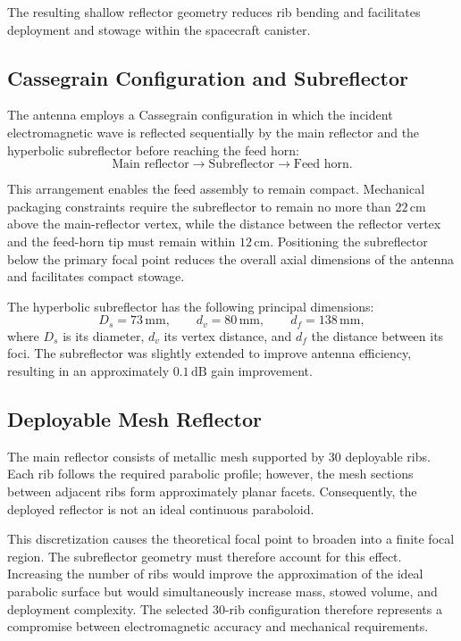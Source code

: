 The resulting shallow reflector geometry reduces rib bending and facilitates deployment and stowage within the spacecraft canister.

\subsection{Cassegrain Configuration and Subreflector}

The antenna employs a Cassegrain configuration in which the incident electromagnetic wave is reflected sequentially by the main reflector and the hyperbolic subreflector before reaching the feed horn:
\[
\text{Main reflector}
\rightarrow
\text{Subreflector}
\rightarrow
\text{Feed horn}.
\]

This arrangement enables the feed assembly to remain compact. Mechanical packaging constraints require the subreflector to remain no more than $22\,\mathrm{cm}$ above the main-reflector vertex, while the distance between the reflector vertex and the feed-horn tip must remain within $12\,\mathrm{cm}$. Positioning the subreflector below the primary focal point reduces the overall axial dimensions of the antenna and facilitates compact stowage.

The hyperbolic subreflector has the following principal dimensions:
\[
D_s=73\,\mathrm{mm},
\qquad
d_v=80\,\mathrm{mm},
\qquad
d_f=138\,\mathrm{mm},
\]
where $D_s$ is its diameter, $d_v$ its vertex distance, and $d_f$ the distance between its foci. The subreflector was slightly extended to improve antenna efficiency, resulting in an approximately $0.1\,\mathrm{dB}$ gain improvement.

\subsection{Deployable Mesh Reflector}

The main reflector consists of metallic mesh supported by 30 deployable ribs. Each rib follows the required parabolic profile; however, the mesh sections between adjacent ribs form approximately planar facets. Consequently, the deployed reflector is not an ideal continuous paraboloid.

This discretization causes the theoretical focal point to broaden into a finite focal region. The subreflector geometry must therefore account for this effect. Increasing the number of ribs would improve the approximation of the ideal parabolic surface but would simultaneously increase mass, stowed volume, and deployment complexity. The selected 30-rib configuration therefore represents a compromise between electromagnetic accuracy and mechanical requirements.


